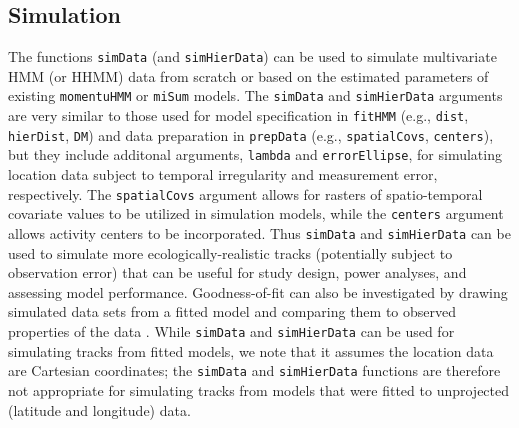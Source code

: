 \documentclass[12pt]{article}\usepackage[]{graphicx}\usepackage[]{xcolor}
\begin{document}
\subsection{Simulation}
The functions \verb|simData| (and \verb|simHierData|) can be used to simulate multivariate HMM (or HHMM) data from scratch or based on the estimated parameters of existing \verb|momentuHMM| or \verb|miSum| models.  The \verb|simData| and \verb|simHierData| arguments are very similar to those used for model specification in \verb|fitHMM| (e.g., \verb|dist|, \verb|hierDist|, \verb|DM|) and data preparation in \verb|prepData| (e.g., \verb|spatialCovs|, \verb|centers|), but they include additonal arguments, \verb|lambda| and \verb|errorEllipse|, for simulating location data subject to temporal irregularity and measurement error, respectively. The \verb|spatialCovs| argument allows for rasters of spatio-temporal covariate values to be utilized in simulation models, while the \verb|centers| argument allows activity centers to be incorporated. Thus \verb|simData| and \verb|simHierData| can be used to simulate more ecologically-realistic tracks (potentially subject to observation error) that can be useful for study design, power analyses, and assessing model performance. Goodness-of-fit can also be investigated by drawing simulated data sets from a fitted model and comparing them to observed properties of the data \citep{MoralesEtAl2004}. While \verb|simData| and \verb|simHierData| can be used for simulating tracks from fitted models, we note that it assumes the location data are Cartesian coordinates; the \verb|simData| and \verb|simHierData| functions are therefore not appropriate for simulating tracks from models that were fitted to unprojected (latitude and longitude) data.
\end{document}
